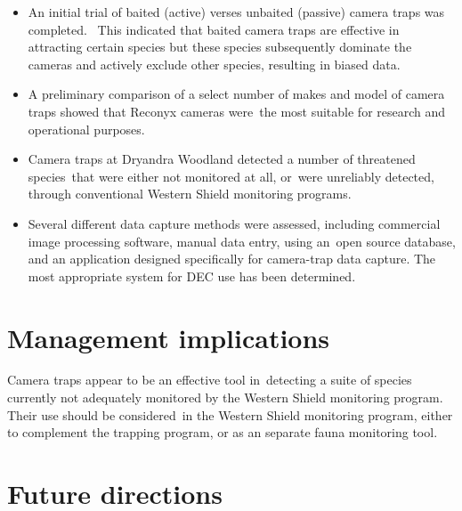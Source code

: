 \documentclass[version=last, paper=a4, DIV=18, usenames, dvipsnames]{scrartcl}
\begin{document}
\begin{itemize}

  \item An initial trial of baited (active) verses unbaited (passive) camera traps was completed.  This indicated that baited camera traps are effective in attracting certain species but these species subsequently dominate the cameras and actively exclude other species, resulting in biased data.

  \item A preliminary comparison of a select number of makes and model of camera traps showed that Reconyx cameras were the most suitable for research and operational purposes.

  \item Camera traps at Dryandra Woodland detected a number of threatened species that were either not monitored at all, or were unreliably detected, through conventional Western Shield monitoring programs.

  \item Several different data capture methods were assessed, including commercial image processing software, manual data entry, using an open source database, and an application designed specifically for camera-trap data capture. The most appropriate system for DEC use has been determined.

\end{itemize}






\section{Management implications}



Camera traps appear to be an effective tool in detecting a suite of species currently not adequately monitored by the Western Shield monitoring program. Their use should be considered in the Western Shield monitoring program, either to complement the trapping program, or as an separate fauna monitoring tool.






\section{Future directions}
\end{document}
